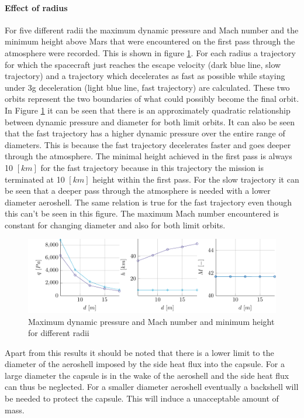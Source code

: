 \paragraph{Effect of radius}
For five different radii the maximum dynamic pressure and Mach number and the minimum height above Mars that were encountered on the first pass through the atmosphere were recorded. This is shown in figure \ref{fig:radius}. For each radius a trajectory for which the spacecraft just reaches the escape velocity (dark blue line, slow trajectory) and a trajectory which decelerates as fast as possible while staying under 3g deceleration (light blue line, fast trajectory) are calculated. These two orbits represent the two boundaries of what could possibly become the final orbit. In Figure \ref{fig:radius} it can be seen that there is an approximately quadratic relationship between dynamic pressure and diameter for both limit orbits. It can also be seen that the fast trajectory has a higher dynamic pressure over the entire range of diameters. This is because the fast trajectory decelerates faster and goes deeper through the atmosphere. The minimal height achieved in the first pass is always 10 $\left[km\right]$ for the fast trajectory because in this trajectory the mission is terminated at 10 $\left[km\right]$ height within the first pass. For the slow trajectory it can be seen that a deeper pass through the atmosphere is needed with a lower diameter aeroshell. The same relation is true for the fast trajectory even though this can't be seen in this figure. The maximum Mach number encountered is constant for changing diameter and also for both limit orbits.

\begin{figure}[h]
	\centering
	\includegraphics[width=\textwidth]{./Figure/orbit/radius_param.pdf}
	\caption{Maximum dynamic pressure and Mach number and minimum height for different radii}
	\label{fig:radius}
\end{figure}

Apart from this results it should be noted that there is a lower limit to the diameter of the aeroshell imposed by the side heat flux into the capsule. For a large diameter the capsule is in the wake of the aeroshell and the side heat flux can thus be neglected. For a smaller diameter aeroshell eventually a backshell will be needed to protect the capsule. This will induce a unacceptable amount of mass.

